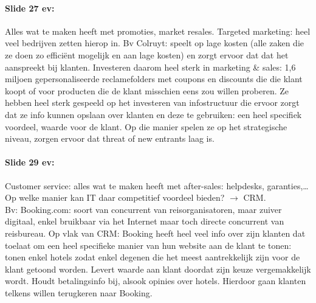 \documentclass[10pt,a4paper]{report}
\begin{document}
\paragraph{Slide 27 ev:}Alles wat te maken heeft met promoties, market resales. Targeted marketing: heel veel bedrijven zetten hierop in. Bv Colruyt: speelt op lage kosten (alle zaken die ze doen zo efficiënt mogelijk en aan lage kosten) en zorgt ervoor dat dat het aanspreekt bij klanten. Investeren daarom heel sterk in marketing \& sales: 1,6 miljoen gepersonaliseerde reclamefolders met coupons en discounts die die klant koopt of voor producten die de klant misschien eens zou willen proberen. Ze hebben heel sterk gespeeld op het investeren van infostructuur die ervoor zorgt dat ze info kunnen opslaan over klanten en deze te gebruiken: een heel specifiek voordeel, waarde voor de klant. Op die manier spelen ze op het strategische niveau, zorgen ervoor dat threat of new entrants laag is.

\paragraph{Slide 29 ev:}Customer service: alles wat te maken heeft met after-sales: helpdesks, garanties,… Op welke manier kan IT daar competitief voordeel bieden? $\rightarrow$ CRM.\\
Bv: Booking.com: soort van concurrent van reisorganisatoren, maar zuiver digitaal, enkel bruikbaar via het Internet maar toch directe concurrent van reisbureau. Op vlak van CRM: Booking heeft heel veel info over zijn klanten dat toelaat om een heel specifieke manier van hun website aan de klant te tonen: tonen enkel hotels zodat enkel degenen die het meest aantrekkelijk zijn voor de klant getoond worden. Levert waarde aan klant doordat zijn keuze vergemakkelijk wordt. Houdt betalingsinfo bij, alsook opinies over hotels. Hierdoor gaan klanten telkens willen terugkeren naar Booking.
\end{document}
